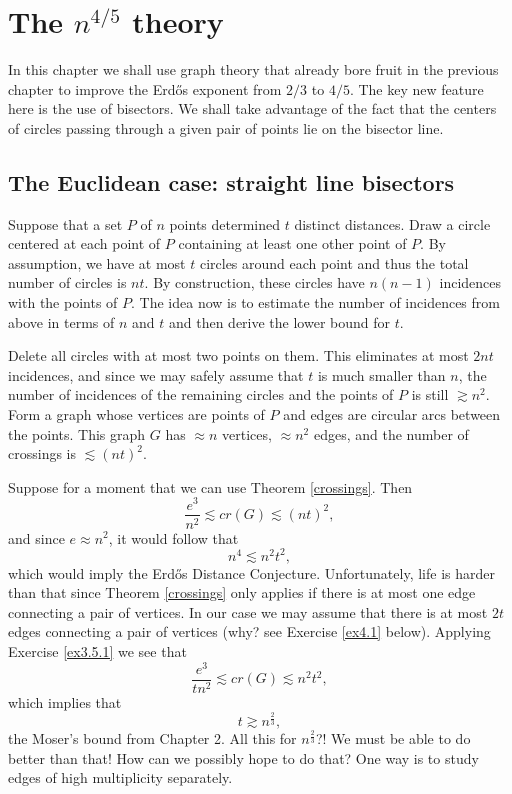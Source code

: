 \documentclass[]{stml-l}
\numberwithin{equation}{chapter}
\theoremstyle{plain}
\theoremstyle{definition}
\theoremstyle{remark}
\begin{document}
\chapter{The $n^{4/5}$ theory} 


In this chapter we shall use graph theory that already bore fruit in
the previous chapter to improve the Erd\H{o}s exponent from $2/3$ to $4/5$. The key new feature here is the use of bisectors. We shall take advantage of the fact that the centers of circles passing through a given pair of points lie on the bisector line. 

\section{The Euclidean case: straight line bisectors}

Suppose that a set $P$ of $n$ points determined $t$ distinct distances. Draw
a circle centered at each point of $P$ containing at least one other
point of $P$.
By assumption, we have at most $t$ circles around each point and thus the total
number of circles is $nt$. By construction, these circles have
$n(n-1)$ incidences
with the points of $P$. The idea now is to estimate the number of incidences
from above in terms of $n$ and $t$ and then derive the lower bound for $t$.

Delete all circles with at most two points on them. This eliminates at
most $2nt$
incidences, and since we may safely assume that $t$ is much smaller than $n$,
the number of incidences of the remaining circles and the points of
$P$ is still
$\gtrsim n^2$. Form a graph whose vertices are points of $P$ and edges are
circular arcs between the points. This graph $G$ has $\approx n$ vertices,
$\approx n^2$
edges, and the number of crossings is $\lesssim {(nt)}^2$.

Suppose for a moment that we can use Theorem \ref{crossings}. Then
\begin{equation}
\frac{e^3}{n^2} \lesssim cr(G) \lesssim {(nt)}^2,
\end{equation}
 and since
$e \approx n^2$, it would follow that
\begin{equation}
n^4 \lesssim n^2t^2,
\end{equation}
 which would imply the Erd\H{o}s Distance Conjecture.
Unfortunately, life is harder than that since Theorem \ref{crossings} only applies
if there is
at most one edge connecting a pair of vertices. In our case we may assume
that there is at most $2t$ edges connecting a pair of vertices (why? see
Exercise \ref{ex4.1} below). Applying Exercise \ref{ex3.5.1} we see that
\begin{equation}
\frac{e^3}{tn^2} \lesssim cr(G) \lesssim n^2t^2,
\end{equation}
 which
implies that \begin{equation}
 t \gtrsim n^{\frac{2}{3}},
\end{equation}
 the Moser's bound from Chapter 2. All this
for $n^{\frac{2}{3}}$?! We must be able to do better than that! How can we
possibly hope to do that? One way is to study edges of high multiplicity
separately.
\end{document}
